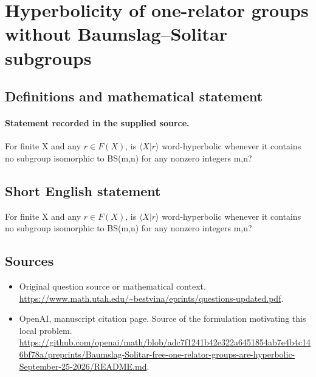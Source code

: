 \documentclass[11pt]{article}
\begin{document}
\section*{Hyperbolicity of one-relator groups without Baumslag–Solitar subgroups}\label{30007190}
\subsection{Definitions and mathematical statement}
\paragraph{Statement recorded in the supplied source.}
For finite X and any $r\in F(X)$, is $\langle X|r\rangle $ word-hyperbolic whenever it contains no subgroup isomorphic to BS(m,n) for any nonzero integers m,n?
\subsection{Short English statement}
For finite X and any $r\in F(X)$, is $\langle X|r\rangle $ word-hyperbolic whenever it contains no subgroup isomorphic to BS(m,n) for any nonzero integers m,n?
\subsection{Sources}
\begin{itemize}
\item[S1] Original question source or mathematical context.
\url{https://www.math.utah.edu/~bestvina/eprints/questions-updated.pdf}.
\item[S2] OpenAI, manuscript citation page. Source of the formulation motivating this local problem.
\url{https://github.com/openai/math/blob/adc7f1241b42e322a6451854ab7e4b4c146bf78a/preprints/Baumslag-Solitar-free-one-relator-groups-are-hyperbolic-September-25-2026/README.md}.
\end{itemize}
\end{document}
